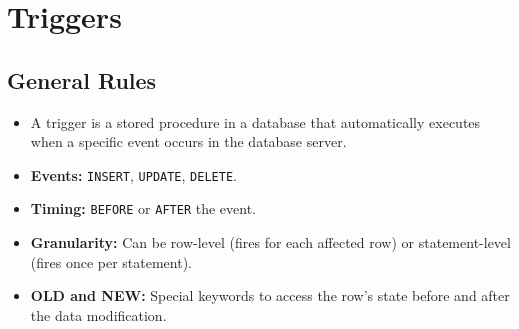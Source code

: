 
\section*{Triggers}

\subsection*{General Rules}
\begin{itemize}
    \item A trigger is a stored procedure in a database that automatically executes when a specific event occurs in the database server.
    \item \textbf{Events:} \texttt{INSERT}, \texttt{UPDATE}, \texttt{DELETE}.
    \item \textbf{Timing:} \texttt{BEFORE} or \texttt{AFTER} the event.
    \item \textbf{Granularity:} Can be row-level (fires for each affected row) or statement-level (fires once per statement).
    \item \textbf{OLD and NEW:} Special keywords to access the row's state before and after the data modification.
\end{itemize}
